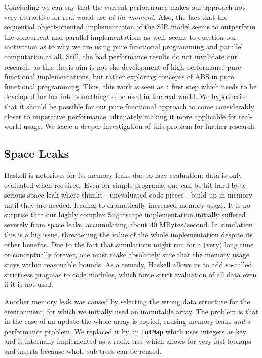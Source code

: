 Concluding we can say that the current performance makes our approach not very attractive for real-world use \textit{at the moment}. Also, the fact that the sequential object-oriented implementation of the SIR model seems to outperform the concurrent and parallel implementations as well, seems to question our motivation as to why we are using pure functional programming and parallel computation at all. Still, the bad performance results do not invalidate our research, as this thesis aim is not the development of high-performance pure functional implementations, but rather exploring concepts of ABS in pure functional programming. Thus, this work is seen as a first step which needs to be developed further into something to be used in the real world. We hypothesise that it should be possible for our pure functional approach to come considerably closer to imperative performance, ultimately making it more applicable for real-world usage. We leave a deeper investigation of this problem for further research.

\subsection{Space Leaks}
Haskell is notorious for its memory leaks due to lazy evaluation: data is only evaluated when required. Even for simple programs, one can be hit hard by a serious space leak where thunks - unevaluated code pieces - build up in memory until they are needed, leading to dramatically increased memory usage. It is no surprise that our highly complex Sugarscape implementation initially suffered severely from space leaks, accumulating about 40 MBytes/second. In simulation this is a big issue, threatening the value of the whole implementation despite its other benefits. Due to the fact that simulations might run for a (very) long time or conceptually forever, one must make absolutely sure that the memory usage stays within reasonable bounds. As a remedy, Haskell allows us to add so-called strictness pragmas to code modules, which force strict evaluation of all data even if it is not used. %

Another memory leak was caused by selecting the wrong data structure for the environment, for which we initially used an immutable array. The problem is that in the case of an update the whole array is copied, causing memory leaks \textit{and} a performance problem. We replaced it by an \texttt{IntMap} which uses integers as key and is internally implemented as a radix tree which allows for very fast lookups and inserts because whole sub-trees can be reused.

